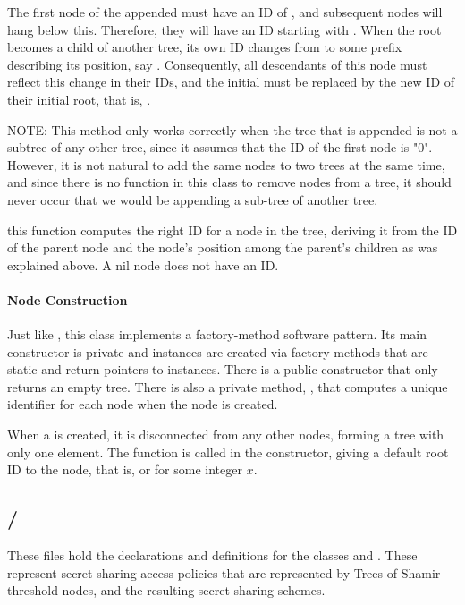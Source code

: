 \documentclass{article}
\begin{document}
\begin{description}
The first node of the appended \ctree must have an ID of , and subsequent nodes will hang below this. Therefore, they will have an ID starting with . When the root becomes a child of another tree, its own ID changes from  to some prefix describing its position, say . Consequently, all descendants of this node must reflect this change in their IDs, and the initial  must be replaced by the new ID of their initial root, that is, .

NOTE: This method only works correctly when the tree that is appended is not a subtree of any other tree, since it assumes that the ID of the first node is "0". However, it is not natural to add the same nodes to two trees at the same time, and since there is no function in this class to remove nodes from a tree, it should never occur that we would be appending a sub-tree of another tree.

\item[\code{findIDForNode()}] this function computes the right ID for a node in the tree, deriving it from the ID of the parent node and the node's position among the parent's children as was explained above. A nil node does not have an ID. 
\end{description}


\paragraph{Node Construction}

Just like \cnode, this class implements a factory-method software pattern. Its main constructor is private and instances are created via factory methods that are static and return pointers to \ctree instances. There is a public constructor that only returns an empty tree. There is also a private method, , that computes a unique identifier for each node when the node is created.

When a \ctree is created, it is disconnected from any other nodes, forming a tree with only one element. The function  is called in the constructor, giving a default root ID to the node, that is,  or  for some integer $x$. 


\subsection{\fhshtree / \fcshtree}

These files hold the declarations and definitions for the classes \cShTreeAP and \cShTree. These represent secret sharing access policies that are represented by Trees of Shamir threshold nodes, and the resulting secret sharing schemes.
\end{document}
